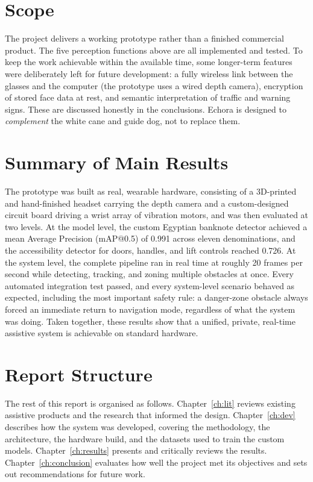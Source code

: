 \section{Scope}

The project delivers a working prototype rather than a finished commercial product. The five perception functions above are all implemented and tested. To keep the work achievable within the available time, some longer-term features were deliberately left for future development: a fully wireless link between the glasses and the computer (the prototype uses a wired depth camera), encryption of stored face data at rest, and semantic interpretation of traffic and warning signs. These are discussed honestly in the conclusions. Echora is designed to \emph{complement} the white cane and guide dog, not to replace them.

\section{Summary of Main Results}

The prototype was built as real, wearable hardware, consisting of a 3D-printed and hand-finished headset carrying the depth camera and a custom-designed circuit board driving a wrist array of vibration motors, and was then evaluated at two levels. At the model level, the custom Egyptian banknote detector achieved a mean Average Precision (mAP@0.5) of 0.991 across eleven denominations, and the accessibility detector for doors, handles, and lift controls reached 0.726. At the system level, the complete pipeline ran in real time at roughly 20 frames per second while detecting, tracking, and zoning multiple obstacles at once. Every automated integration test passed, and every system-level scenario behaved as expected, including the most important safety rule: a danger-zone obstacle always forced an immediate return to navigation mode, regardless of what the system was doing. Taken together, these results show that a unified, private, real-time assistive system is achievable on standard hardware.

\section{Report Structure}

The rest of this report is organised as follows. Chapter~\ref{ch:lit} reviews existing assistive products and the research that informed the design. Chapter~\ref{ch:dev} describes how the system was developed, covering the methodology, the architecture, the hardware build, and the datasets used to train the custom models. Chapter~\ref{ch:results} presents and critically reviews the results. Chapter~\ref{ch:conclusion} evaluates how well the project met its objectives and sets out recommendations for future work.
